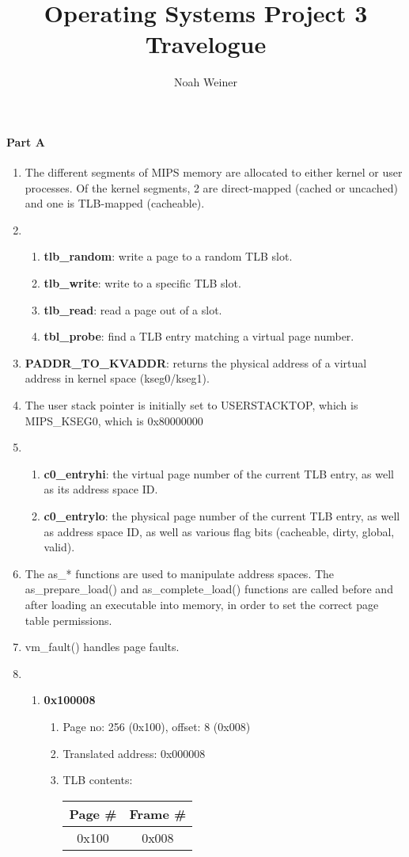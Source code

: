 \documentclass{proc}
\title{Operating Systems Project 3 Travelogue}
\author{Noah Weiner}
\begin{document}
\maketitle

\paragraph{Part A}
\begin{enumerate}
  \item The different segments of MIPS memory are allocated to either kernel or user processes. Of the kernel segments, 2 are direct-mapped (cached or uncached) and one is TLB-mapped (cacheable).
  \item \begin{enumerate}
  	\item \textbf{tlb\_random}: write a page to a random TLB slot.
  	\item \textbf{tlb\_write}: write to a specific TLB slot.
  	\item \textbf{tlb\_read}: read a page out of a slot.
  	\item \textbf{tbl\_probe}: find a TLB entry matching a virtual page number.
  \end{enumerate}
  \item \textbf{PADDR\_TO\_KVADDR}: returns the physical address of a virtual address in kernel space (kseg0/kseg1).
  \item The user stack pointer is initially set to USERSTACKTOP, which is MIPS\_KSEG0, which is 0x80000000
  \item \begin{enumerate}
  	\item \textbf{c0\_entryhi}: the virtual page number of the current TLB entry, as well as its address space ID.
  	\item \textbf{c0\_entrylo}: the physical page number of the current TLB entry, as well as address space ID, as well as various flag bits (cacheable, dirty, global, valid).
  \end{enumerate}
  \item The as\_* functions are used to manipulate address spaces. The as\_prepare\_load() and as\_complete\_load() functions are called before and after loading an executable into memory, in order to set the correct page table permissions.
  \item vm\_fault() handles page faults.
  
  \item \begin{enumerate}
  	\item \textbf{0x100008} \begin{enumerate}
  		\item Page no: 256 (0x100), offset: 8 (0x008)
  		\item Translated address: 0x000008
  		\item TLB contents: \begin{tabular}{c|c}
  			Page \# & Frame \# \\ \hline
  			0x100 & 0x008
  		\end{tabular}
  	\end{enumerate}
  	

\end{enumerate}
\end{enumerate}
\end{document}
